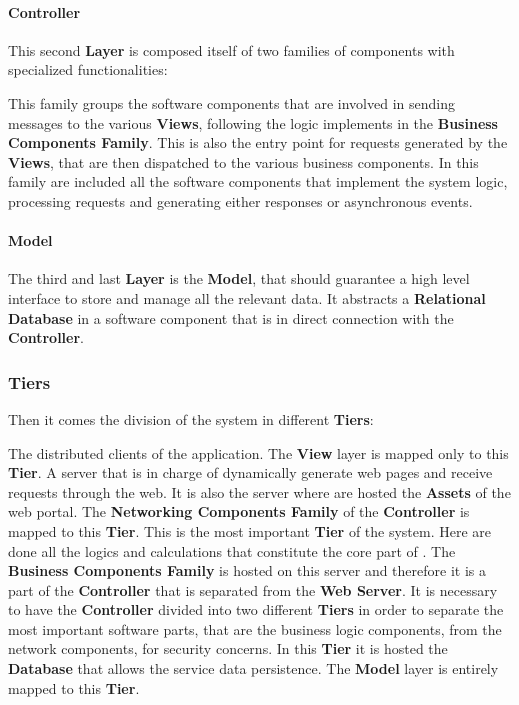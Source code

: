 \paragraph{Controller}
This second \textbf{Layer} is composed itself of two families of components with specialized functionalities:
\begin{itemize}
	 This family groups the software components that are involved in sending messages to the various \textbf{Views}, following the logic implements in the \textbf{Business Components Family}.
	This is also the entry point for requests generated by the \textbf{Views}, that are then dispatched to the various business components.
	 In this family are included all the software components that implement the system logic, processing requests and generating either responses or asynchronous events.
\end{itemize}

\paragraph{Model}
The third and last \textbf{Layer} is the \textbf{Model}, that should guarantee a high level interface to store and manage all the \myTaxiService{} relevant data.
It abstracts a \textbf{Relational Database} in a software component that is in direct connection with the \textbf{Controller}.

\subsubsection{Tiers}
Then it comes the division of the system in different \textbf{Tiers}:
\begin{itemize}
	 The distributed clients of the application. The \textbf{View} layer is mapped only to this \textbf{Tier}.
	 A server that is in charge of dynamically generate web pages and receive requests through the web. It is also the server where are hosted the \textbf{Assets} of the web portal. The \textbf{Networking Components Family} of the \textbf{Controller} is mapped to this \textbf{Tier}.
	 This is the most important \textbf{Tier} of the system. Here are done all the logics and calculations that constitute the core part of \myTaxiService{}. The \textbf{Business Components Family} is hosted on this server and therefore it is a part of the \textbf{Controller} that is separated from the \textbf{Web Server}. It is necessary to have the \textbf{Controller} divided into two different \textbf{Tiers} in order to separate the most important software parts, that are the business logic components, from the network components, for security concerns.
	In this \textbf{Tier} it is hosted the \textbf{Database} that allows the service data persistence. The \textbf{Model} layer is entirely mapped to this \textbf{Tier}.
\end{itemize}

